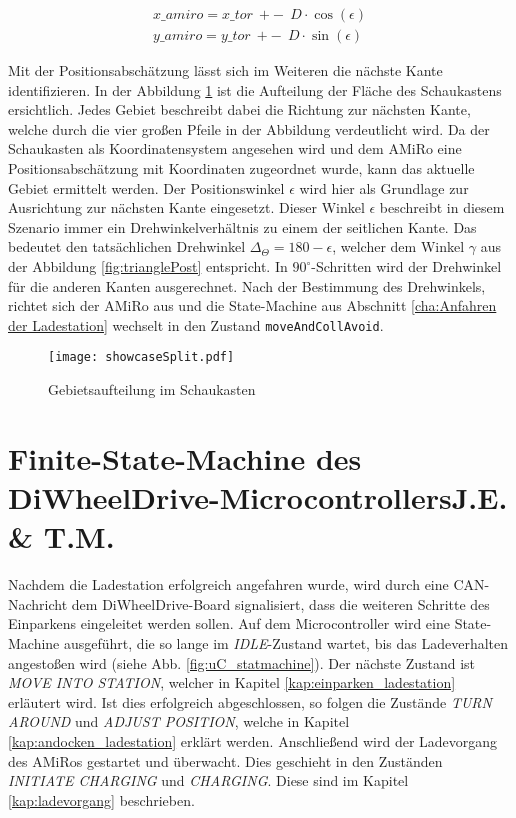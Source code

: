 \begin{equation}
	\begin{aligned}
		x\_amiro = x\_tor~+-~~D \cdot \cos(\epsilon) \\
		y\_amiro = y\_tor~+-~~D \cdot \sin(\epsilon)
		\label{eq:positionCoords}
	\end{aligned}
\end{equation}

Mit der Positionsabschätzung lässt sich im Weiteren die nächste Kante identifizieren. In der Abbildung \ref{fig:showcaseSplit} ist die Aufteilung der Fläche des Schaukastens ersichtlich. Jedes Gebiet beschreibt dabei die Richtung zur nächsten Kante, welche durch die vier großen Pfeile in der Abbildung verdeutlicht wird. Da der Schaukasten als Koordinatensystem angesehen wird und dem AMiRo eine Positionsabschätzung mit Koordinaten zugeordnet wurde, kann das aktuelle Gebiet ermittelt werden. Der Positionswinkel $\epsilon$ wird hier als Grundlage zur Ausrichtung zur nächsten Kante eingesetzt. Dieser Winkel $\epsilon$ beschreibt in diesem Szenario immer ein Drehwinkelverhältnis zu einem der seitlichen Kante. Das bedeutet den tatsächlichen Drehwinkel $\Delta_\Theta = 180 - \epsilon$, welcher dem Winkel $\gamma$ aus der Abbildung \ref{fig:trianglePost} entspricht. In $90^\circ$-Schritten wird der Drehwinkel für die anderen Kanten ausgerechnet. Nach der Bestimmung des Drehwinkels, richtet sich der AMiRo aus und die State-Machine aus Abschnitt \ref{cha:Anfahren der Ladestation} wechselt in den Zustand \texttt{moveAndCollAvoid}.

\begin{figure}[h]
	\begin{center}
		\texttt{[image: showcaseSplit.pdf]} 	
		\caption{Gebietsaufteilung im Schaukasten}
		\label{fig:showcaseSplit}
	\end{center}
\end{figure}

\section[Finite-State-Machine des DiWheelDrive-Microcontrollers]{Finite-State-Machine des DiWheelDrive-Microcontrollers\hfill {\normalsize J.E. \& T.M.}} %

Nachdem die Ladestation erfolgreich angefahren wurde, wird durch eine CAN-Nachricht dem DiWheelDrive-Board signalisiert, dass die weiteren Schritte des Einparkens eingeleitet werden sollen.
Auf dem Microcontroller wird eine State-Machine ausgeführt, die so lange im \textit{IDLE}-Zustand wartet, bis das Ladeverhalten angestoßen wird (siehe Abb. \ref{fig:uC_statmachine}).
Der nächste Zustand ist \textit{MOVE INTO STATION}, welcher in Kapitel \ref{kap:einparken_ladestation} erläutert wird. Ist dies erfolgreich abgeschlossen, so folgen die Zustände \textit{TURN AROUND} und \textit{ADJUST POSITION}, welche in Kapitel \ref{kap:andocken_ladestation} erklärt werden. Anschließend wird der Ladevorgang des AMiRos gestartet und überwacht. Dies geschieht in den Zuständen \textit{INITIATE CHARGING} und \textit{CHARGING}. Diese sind im Kapitel \ref{kap:ladevorgang} beschrieben.

